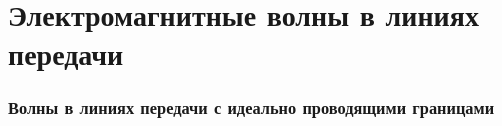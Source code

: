 \documentclass[a4paper,14pt]{extarticle}
\theoremstyle{definition}
\begin{document}

\newpage
\tableofcontents 
\newpage

\part{Электромагнитные волны в линиях передачи}

\section{Волны в линиях передачи с идеально проводящими границами}


\newpage
\end{document}
